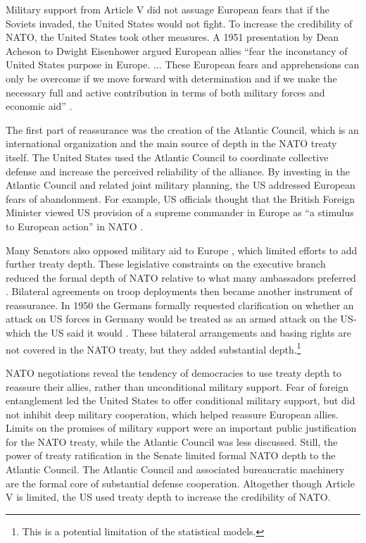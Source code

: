 \documentclass[12pt]{article}
\begin{document}
Military support from Article V did not assuage European fears that if the Soviets invaded, the United States would not fight. 
To increase the credibility of NATO, the United States took other measures.  
A 1951 presentation by Dean Acheson to Dwight Eisenhower argued European allies ``fear the inconstancy of United States purpose in Europe. ... These European fears and apprehensions can only be overcome if we move forward with determination and if we make the necessary full and active contribution in terms of both military forces and economic aid'' \citep[pg. 3]{Acheson1951}. 


The first part of reassurance was the creation of the Atlantic Council, which is an international organization and the main source of depth in the NATO treaty itself. 
The United States used the Atlantic Council to coordinate collective defense and increase the perceived reliability of the alliance. 
By investing in the Atlantic Council and related joint military planning, the US addressed European fears of abandonment. 
For example, US officials thought that the British Foreign Minister viewed US provision of a supreme commander in Europe as ``a stimulus to European action'' in NATO \citep{Acheson1950}. 


Many Senators also opposed military aid to Europe \citep[pg 285]{Acheson1969}, which limited efforts to add further treaty depth. 
These legislative constraints on the executive branch reduced the formal depth of NATO relative to what many ambassadors preferred \citep[pg 277]{Acheson1969}. 
Bilateral agreements on troop deployments then became another instrument of reassurance. 
In 1950 the Germans formally requested clarification on whether an attack on US forces in Germany would be treated as an armed attack on the US- which the US said it would \citep[pg. 395]{Acheson1969}.  
These bilateral arrangements and basing rights are not covered in the NATO treaty, but they added substantial depth.\footnote{This is a potential limitation of the statistical models.}  


NATO negotiations reveal the tendency of democracies to use treaty depth to reassure their allies, rather than unconditional military support. 
Fear of foreign entanglement led the United States to offer conditional military support, but did not inhibit deep military cooperation, which helped reassure European allies. 
Limits on the promises of military support were an important public justification for the NATO treaty, while the Atlantic Council was less discussed. 
Still, the power of treaty ratification in the Senate limited formal NATO depth to the Atlantic Council. 
The Atlantic Council and associated bureaucratic machinery are the formal core of substantial defense cooperation. 
Altogether though Article V is limited, the US used treaty depth to increase the credibility of NATO. 
\end{document}
